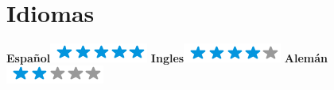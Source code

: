 \begin{aside}
    ~
    ~
    ~
    ~
    ~
    ~
    ~
    ~
    ~
    ~
    ~
    ~
    ~
    ~
    ~
    ~
    ~
    ~
    ~
    ~
    ~
    ~
    ~
    ~
    ~
    ~
    ~
    ~
  \section{Idiomas}
    \textbf{Español}\includegraphics[scale=0.40]{img/5stars.png}
    \textbf{Ingles}\includegraphics[scale=0.40]{img/4stars.png}
    \textbf{Alemán}\includegraphics[scale=0.40]{img/2stars.png}
\end{aside}
